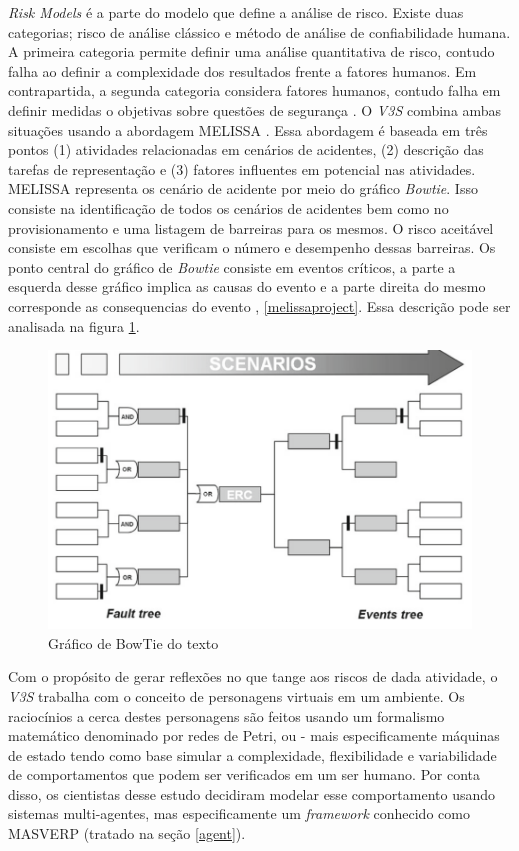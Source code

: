 \textit{Risk Models} é a parte do modelo que define a análise de risco. Existe duas categorias; risco de análise clássico e método de análise de confiabilidade humana. A primeira categoria permite definir uma análise quantitativa de risco, contudo falha ao definir a complexidade dos resultados frente a fatores humanos. Em contrapartida, a segunda categoria considera fatores humanos, contudo falha em definir medidas o objetivas sobre questões de segurança \cite{v3sframework}. O \textit{V3S} combina ambas situações usando a abordagem MELISSA \cite{melissaproject} \cite{v3sframework}. Essa abordagem é baseada em três pontos (1) atividades relacionadas em cenários de acidentes, (2) descrição das tarefas de representação e (3) fatores influentes em potencial nas atividades. MELISSA representa os cenário de acidente por meio do gráfico \textit{Bowtie}. Isso consiste na identificação de todos os cenários de acidentes bem como no provisionamento e uma listagem de barreiras para os mesmos. O risco aceitável consiste em escolhas que verificam o número e desempenho dessas barreiras. Os ponto central do gráfico de \textit{Bowtie} consiste em eventos críticos, a parte a esquerda desse gráfico implica as causas do evento e a parte direita do mesmo corresponde as consequencias do evento \cite{v3sframework}, \ref{melissaproject}. Essa descrição pode ser analisada na figura \ref{bowtiegraf}. 


\begin{figure}[H]
  \centering
  \includegraphics[width=0.5\linewidth]{figure/bowtie.png} 
  \caption{Gráfico de BowTie do texto \cite{melissaproject}}
  \label{bowtiegraf}
\end{figure}


Com o propósito de gerar reflexões no que tange aos riscos de dada atividade, o \textit{V3S} trabalha com o conceito de personagens virtuais em um ambiente. Os raciocínios a cerca destes personagens são feitos usando um formalismo matemático denominado por redes de Petri, ou - mais especificamente máquinas de estado \cite{v3sframework} tendo como base simular a complexidade, flexibilidade e variabilidade de comportamentos que podem ser verificados em um ser humano. Por conta disso, os cientistas desse estudo decidiram modelar esse comportamento usando sistemas multi-agentes, mas especificamente um \textit{framework} conhecido como MASVERP (tratado na seção \ref{agent}).

